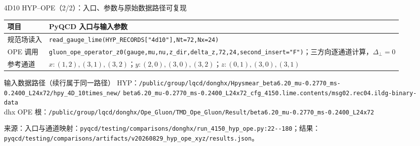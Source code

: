 \documentclass[UTF8,aspectratio=169,11pt]{ctexbeamer}
\newcommand{\source}[1]{\vspace{0.05em}\par{\raggedright\scriptsize\color{muted}来源：#1\par}}
\newcommand{\codepath}[1]{\nolinkurl{#1}}
\begin{document}
\begin{frame}[t]{4D10 HYP--OPE（2/2）：入口、参数与原始数据路径可复现}
  \footnotesize
  \setlength{\tabcolsep}{3pt}
  \begin{tabularx}{0.96\textwidth}{@{}P{0.22\textwidth}Y@{}}
    \toprule
    项目 & PyQCD 入口与输入参数 \\
    \midrule
    规范场读入 & \codepath{read_gauge_lime(HYP_RECORDS["4d10"],Nt=72,Nx=24)} \\
    OPE 调用 & \codepath{gluon_ope_operator_z0(gauge,mu,nu,z_dir,delta_z,72,24,second_insert="F")}；三方向逐通道计算，$\Delta_\perp=0$ \\
    参考通道 & $x:(1,2),(3,1),(3,2)$；$y:(2,0),(3,0),(3,2)$；$z:(0,1),(3,0),(3,1)$ \\
    \bottomrule
  \end{tabularx}
  \vspace{-0.45em}
  \begin{block}{输入数据路径（续行属于同一路径）}
    \scriptsize
    HYP：\codepath{/public/group/lqcd/donghx/Hpysmear_beta6.20_mu-0.2770_ms-0.2400_L24x72/hpy_4D_10times_new/}\newline
    \hspace*{2.7em}\codepath{beta6.20_mu-0.2770_ms-0.2400_L24x72_cfg_4150.lime.contents/msg02.rec04.ildg-binary-data}\\
    dhx OPE 根：\codepath{/public/group/lqcd/donghx/Ope_Gluon/TMD_Ope_Gluon/Result/beta6.20_mu-0.2770_ms-0.2400_L24x72}
  \end{block}
  \source{入口与通道映射：\codepath{pyqcd/testing/comparisons/donghx/run_4150_hyp_ope.py:22--180}；结果：\codepath{pyqcd/testing/comparisons/artifacts/v20260829_hyp_ope_xyz/results.json}。}
\end{frame}
\end{document}
